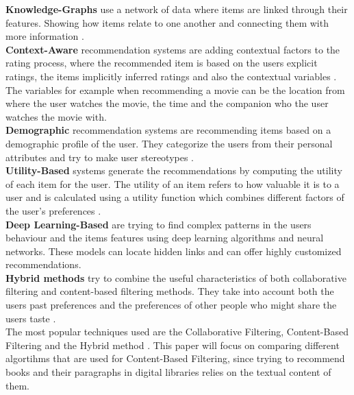 \documentclass{llncs}
\begin{document}
%
%
\textbf{Knowledge-Graphs} use a network of data where items are linked through their features. Showing how items relate to one another and connecting them with more information \cite{Imene2022488}.\\
%
%
\textbf{Context-Aware} recommendation systems are adding contextual factors to the rating process, where the recommended item is based on the users explicit ratings, the items implicitly inferred ratings and also the contextual variables \cite{Haruna2017}. The variables for example when recommending a movie can be the location from where the user watches the movie, the time and the companion who the user watches the movie with.\\
\textbf{Demographic} recommendation systems are recommending items based on a demographic profile of the user. They categorize the users from their personal attributes and try to make user stereotypes \cite{Burke2002331}.\\
\textbf{Utility-Based} systems generate the recommendations by computing the utility of each item for the user. The utility of an item refers to how valuable it is to a user and is calculated using a utility function which combines different factors of the user's preferences \cite{Burke2002331}.\\
\textbf{Deep Learning-Based} are trying to find complex patterns in the users behaviour and the items features using deep learning algorithms and neural networks. These models can locate hidden links and can offer highly customized recommendations.\\
\textbf{Hybrid methods} try to combine the useful characteristics of both collaborative filtering and content-based filtering methods. They take into account both the users past preferences and the preferences of other people who might share the users taste \cite{melville:aaai02}. \\
%
The most popular techniques used are the Collaborative Filtering, Content-Based Filtering and the Hybrid method \cite{pub.1072601078}. This paper will focus on comparing different algortihms that are used for Content-Based Filtering, since trying to recommend books and their paragraphs in digital libraries relies on the textual content of them.
\end{document}
